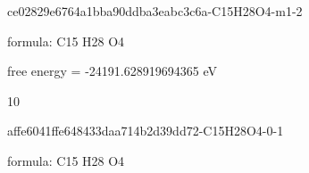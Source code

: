 \documentclass{article}
\begin{document}
\vspace{1cm}


ce02829e6764a1bba90ddba3eabc3c6a-C15H28O4-m1-2



formula: C15 H28 O4



free energy = -24191.628919694365 eV

10

\vspace{1cm}


affe6041ffe648433daa714b2d39dd72-C15H28O4-0-1



formula: C15 H28 O4
\end{document}
